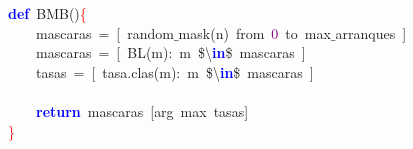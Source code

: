 \noindent
\mbox{}\textbf{\textcolor{Blue}{def}}\ BMB\textcolor{BrickRed}{()}\textcolor{Red}{\{} \\
\mbox{}\ \ \ \ mascaras\ \textcolor{BrickRed}{=}\ \textcolor{BrickRed}{[}\ random$\_$mask\textcolor{BrickRed}{(}n\textcolor{BrickRed}{)}\ from\ \textcolor{Purple}{0}\ to\ max$\_$arranques\ \textcolor{BrickRed}{]} \\
\mbox{}\ \ \ \ mascaras\ \textcolor{BrickRed}{=}\ \textcolor{BrickRed}{[}\ BL\textcolor{BrickRed}{(}m\textcolor{BrickRed}{):}\ m\ \$\textcolor{BrickRed}{\textbackslash{}}\textbf{\textcolor{Blue}{in}}\$\ mascaras\ \textcolor{BrickRed}{]} \\
\mbox{}\ \ \ \ tasas\ \textcolor{BrickRed}{=}\ \textcolor{BrickRed}{[}\ tasa\textcolor{BrickRed}{.}clas\textcolor{BrickRed}{(}m\textcolor{BrickRed}{):}\ m\ \$\textcolor{BrickRed}{\textbackslash{}}\textbf{\textcolor{Blue}{in}}\$\ mascaras\ \textcolor{BrickRed}{]} \\
\mbox{} \\
\mbox{}\ \ \ \ \textbf{\textcolor{Blue}{return}}\ mascaras\ \textcolor{BrickRed}{[}arg\ max\ tasas\textcolor{BrickRed}{]} \\
\mbox{}\textcolor{Red}{\}} \\
\mbox{}
